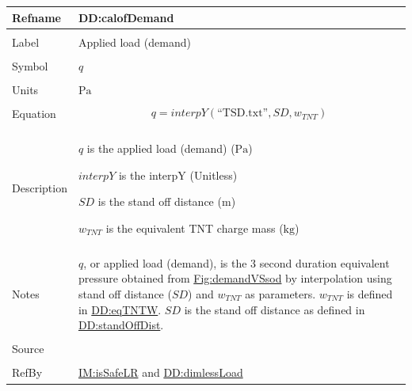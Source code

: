 \documentclass[12pt]{article}
\begin{document}
\vspace{\baselineskip}
\noindent
\begin{minipage}{\textwidth}
\begin{tabular}{>{\raggedright}p{}>{\raggedright\arraybackslash}p{}}
\toprule \textbf{Refname} & \textbf{DD:calofDemand}
\label{DD:calofDemand}
\\ \midrule \\
Label & Applied load (demand)
        
\\ \midrule \\
Symbol & $q$
         
\\ \midrule \\
Units & ${\text{Pa}}$
        
\\ \midrule \\
Equation & \begin{displaymath}
           q=\mathit{interpY}\left(\text{``TSD.txt''},\mathit{SD},{w_{\mathit{TNT}}}\right)
           \end{displaymath}
\\ \midrule \\
Description & \begin{symbDescription}
              \item{$q$ is the applied load (demand) (${\text{Pa}}$)}
              \item{$\mathit{interpY}$ is the interpY (Unitless)}
              \item{$\mathit{SD}$ is the stand off distance (${\text{m}}$)}
              \item{${w_{\mathit{TNT}}}$ is the equivalent TNT charge mass (${\text{kg}}$)}
              \end{symbDescription}
\\ \midrule \\
Notes & $q$, or applied load (demand), is the 3 second duration equivalent pressure obtained from \hyperref[Figure:demandVSsod]{Fig:demandVSsod} by interpolation using stand off distance ($\mathit{SD}$) and ${w_{\mathit{TNT}}}$ as parameters. ${w_{\mathit{TNT}}}$ is defined in \hyperref[DD:eqTNTW]{DD:eqTNTW}. $\mathit{SD}$ is the stand off distance as defined in \hyperref[DD:standOffDist]{DD:standOffDist}.
        
\\ \midrule \\
Source & \cite{astm2009}
         
\\ \midrule \\
RefBy & \hyperref[IM:isSafeLR]{IM:isSafeLR} and \hyperref[DD:dimlessLoad]{DD:dimlessLoad}
        
\\ \bottomrule
\end{tabular}
\end{minipage}
\end{document}
